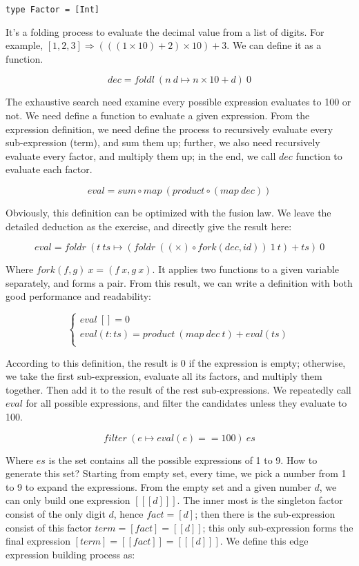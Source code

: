 \documentclass{article}
\begin{document}
\begin{lstlisting}
type Factor = [Int]
\end{lstlisting}

It's a folding process to evaluate the decimal value from a list of digits. For example, $[1, 2, 3] \Rightarrow (((1 \times 10) + 2) \times 10) + 3$. We can define it as a function.

\[
dec = foldl\ (n\ d \mapsto n \times 10 + d)\ 0
\]

The exhaustive search need examine every possible expression evaluates to 100 or not. We need define a function to evaluate a given expression. From the expression definition, we need define the process to recursively evaluate every sub-expression (term), and sum them up; further, we also need recursively evaluate every factor, and multiply them up; in the end, we call $dec$ function to evaluate each factor.

\[
eval = sum \circ map\ (product \circ (map\ dec))
\]

Obviously, this definition can be optimized with the fusion law. We leave the detailed deduction as the exercise, and directly give the result here:

\[
eval = foldr\ (t\ ts \mapsto (foldr\ ((\times) \circ fork(dec, id))\ 1\ t) + ts)\ 0
\]

Where $fork(f, g)\ x = (f\ x, g\ x)$. It applies two functions to a given variable separately, and forms a pair. From this result, we can write a definition with both good performance and readability:

\[
\begin{cases}
eval\ [] = 0 \\
eval (t:ts) = product\ (map\ dec\ t) + eval(ts) \\
\end{cases}
\]

According to this definition, the result is 0 if the expression is empty; otherwise, we take the first sub-expression, evaluate all its factors, and multiply them together. Then add it to the result of the rest sub-expressions. We repeatedly call $eval$ for all possible expressions, and filter the candidates unless they evaluate to 100.

\[
filter\ (e \mapsto eval(e) == 100)\ es
\]

Where $es$ is the set contains all the possible expressions of 1 to 9. How to generate this set? Starting from empty set, every time, we pick a number from 1 to 9 to expand the expressions. From the empty set and a given number $d$, we can only build one expression $[[[d]]]$. The inner most is the singleton factor consist of the only digit $d$, hence $fact = [d]$; then there is the sub-expression consist of this factor $term = [fact] = [[d]]$; this only sub-expression forms the final expression $[term] = [[fact]] = [[[d]]]$. We define this edge expression building process as:
\end{document}
